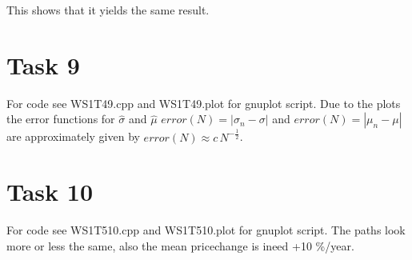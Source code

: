 \documentclass[]{article}
\begin{document}
This shows that it yields the same result.

\section*{Task 9}
For code see WS1T49.cpp and WS1T49.plot for gnuplot script.
%
%
Due to the plots the error functions for $\hat{\sigma}$ and $\hat{\mu}$
$error(N) = \left|\sigma_n - \sigma\right| $ and $error(N) = \left|\mu_n -
\mu\right| $ are approximately given by $error(N) \approx c\,N^{-\frac{1}{2}}$.


\section*{Task 10} For code see WS1T510.cpp and WS1T510.plot for gnuplot script.
The paths look more or less the same, also the mean pricechange is ineed +10
\%/year.
\end{document}
